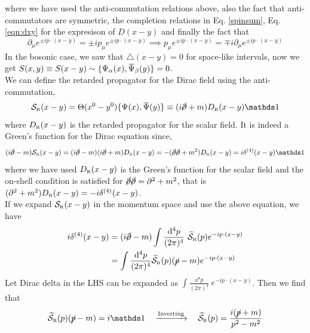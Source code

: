 where we have used the anti-commutation relations above, also the fact that anti-commutators are symmetric, the completion relations in Eq. \ref{spinsum}, Eq. \ref{eqn:dxy} for the expresison of $D(x-y)$ and finally the fact that $$\partial_\mu e^{\pm i p\cdot (x-y)} = \pm i p_\mu e^{\pm i p\cdot (x-y)} \implies p_\mu e^{\pm i p\cdot (x-y)} = \mp i \partial_\mu e^{\pm i p\cdot (x-y)}$$
In the bosonic case, we saw that $\triangle(x-y) =0$ for space-like intervals, now we get $S(x,y)\equiv S(x-y) \sim \{\Psi_\alpha(x), \dadj{\Psi}_\beta(y)\} =0$.\\[0.2cm]
We can define the retarded propagator for the Dirac field using the anti-commutation,
$$\Ss\tund{R}(x-y) = \Theta(x^0-y^0)\{\Psi(x), \dadj{\Psi}(y)\} \equiv (i\gsl{\partial}+m)D\tund{R}(x-y)\iden$$
where $D_{\text{\tiny R}}(x-y)$ is the retarded propagator for the scalar field. It is indeed a Green's function for the Dirac equation since,
$$(i\gsl{\partial}-m)\Ss\tund{R}(x-y) = (i\gsl{\partial}-m)(i\gsl{\partial}+m)D\tund{R}(x-y) = -(\gsl{\partial}\gsl{\partial}+m^2)D\tund{R}(x-y) =  i \delta^{(4)}(x-y)\iden $$ 
where we have used $D_{\text{\tiny R}}(x-y)$ is the Green's function for the scalar field and the on-shell condition is satisfied for $\cancel{\partial}\cancel{\partial} = \partial^2 +m^2$, that is $(\partial^2+m^2)D_{\text{\tiny R}}(x-y) = -i \delta^{(4)}(x-y)$.\\[0.2cm] If we expand $\mathcal S_{\text{\tiny R}}(x-y)$ in the momentum space and use the above equation, we have
\begin{align*}
i \delta^{(4)}(x-y) &= (i\cancel{\partial}-m) \int \frac{\dd^4 p}{(2\pi)^4}\ \widetilde{\mathcal S}_{\text{\tiny R}}(p)e^{-i p \cdot (x-y)} \\
&= \int \frac{\dd^4 p}{(2\pi)^4} \widetilde{\mathcal S}_{\text{\tiny R}}(p)  (\cancel{p}-m)e^{-i p \cdot (x-y)}
\end{align*}
Let Dirac delta in the LHS can be expanded as $\int \frac{\dd^4 p}{(2\pi)^4}\ e^{- ip\cdot (x-y)}$. Then we find that 
$${\widetilde{\Ss}\tund{R}(p)(\gsl{p}-m) = i \iden }\quad \xrightarrow{\text{Inverting}} \quad \widetilde{\Ss}\tund{R}(p)=  \frac{i(\gsl{p}+m)}{p^2-m^2}$$
